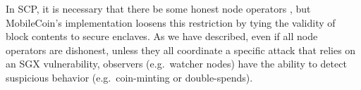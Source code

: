 In SCP, it is necessary that there be some honest node operators \cite{stellar-consensus-protocol}, but MobileCoin's implementation loosens this restriction by tying the validity of block contents to secure enclaves. As we have described, even if all node operators are dishonest, unless they all coordinate a specific attack that relies on an SGX vulnerability, observers (e.g.\ watcher nodes) have the ability to detect suspicious behavior (e.g.\ coin-minting or double-spends).%
